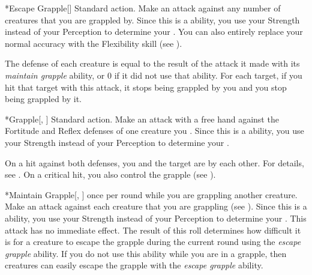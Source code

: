     \begin{activeability}*{Escape Grapple}[]
      \abilityusagetime Standard action.
      \rankline
      Make an attack against any number of creatures that you are grappled by.
      Since this is a  ability, you use your Strength instead of your Perception to determine your .
      You can also entirely replace your normal accuracy with the Flexibility skill (see ).

      The defense of each creature is equal to the result of the attack it made with its \textit{maintain grapple} ability, or 0 if it did not use that ability.
      For each target, if you hit that target with this attack, it stops being grappled by you and you stop being grappled by it.
    \end{activeability}

    \begin{activeability}*{Grapple}[, ]
      \abilityusagetime Standard action.
      \rankline
      Make an attack with a free hand against the Fortitude and Reflex defenses of one creature you .
      Since this is a  ability, you use your Strength instead of your Perception to determine your .

      On a hit against both defenses, you and the target are \grappled by each other.
      For details, see .
      On a critical hit, you also control the grapple (see ).
    \end{activeability}

    \begin{activeability}*{Maintain Grapple}[, ]
      \abilityusagetime {} once per round while you are grappling another creature.
      \rankline
      Make an attack against each creature that you are grappling (see ).
      Since this is a  ability, you use your Strength instead of your Perception to determine your .
      This attack has no immediate effect.
      The result of this roll determines how difficult it is for a creature to escape the grapple during the current round using the \textit{escape grapple} ability.
      If you do not use this ability while you are in a grapple, then creatures can easily escape the grapple with the \textit{escape grapple} ability.
    \end{activeability}

